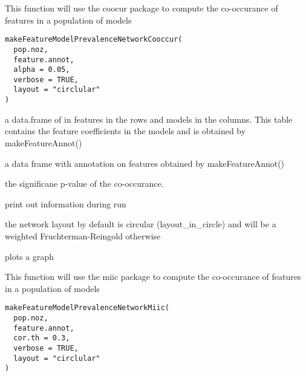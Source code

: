 \documentclass[a4paper]{book}
\begin{document}
%
\begin{Description}
This function will use the coocur package to compute the co-occurance of features in a population of models
\end{Description}
%
\begin{Usage}
\begin{verbatim}
makeFeatureModelPrevalenceNetworkCooccur(
  pop.noz,
  feature.annot,
  alpha = 0.05,
  verbose = TRUE,
  layout = "circlular"
)
\end{verbatim}
\end{Usage}
%
\begin{Arguments}
\begin{ldescription}
\item[\code{pop.noz:}] a data.frame of in features in the rows and models in the columns. 
This table contains the feature coefficients in the models and is obtained by makeFeatureAnnot()

\item[\code{feature.annot:}] a data frame with annotation on features obtained by makeFeatureAnnot()

\item[\code{alpha:}] the significane p-value of the co-occurance.

\item[\code{verbose:}] print out information during run

\item[\code{layout:}] the network layout by default is circular (layout\_in\_circle) and will be a weighted Fruchterman-Reingold otherwise
\end{ldescription}
\end{Arguments}
%
\begin{Value}
plots a graph
\end{Value}
%
\begin{Description}
This function will use the miic package to compute the co-occurance of features in a population of models
\end{Description}
%
\begin{Usage}
\begin{verbatim}
makeFeatureModelPrevalenceNetworkMiic(
  pop.noz,
  feature.annot,
  cor.th = 0.3,
  verbose = TRUE,
  layout = "circlular"
)
\end{verbatim}
\end{Usage}
\end{document}
